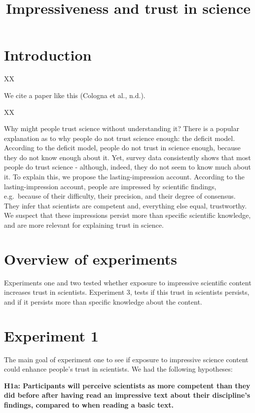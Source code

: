 \documentclass[
  doc,floatsintext]{apa6}
\title{Impressiveness and trust in science}
\author{\textsuperscript{}}
\date{}
\affiliation{\vspace{0.5cm}\textsuperscript{} }
\begin{document}
\maketitle

\section{Introduction}\label{introduction}

XX

We cite a paper like this (Cologna et al., n.d.).

XX

Why might people trust science without understanding it? There is a popular explanation as to why people do not trust science enough: the deficit model. According to the deficit model, people do not trust in science enough, because they do not know enough about it. Yet, survey data consistently shows that most people do trust science - although, indeed, they do not seem to know much about it. To explain this, we propose the lasting-impression account. According to the lasting-impression account, people are impressed by scientific findings, e.g.~because of their difficulty, their precision, and their degree of consensus. They infer that scientists are competent and, everything else equal, trustworthy. We suspect that these impressions persist more than specific scientific knowledge, and are more relevant for explaining trust in science.

\section{Overview of experiments}\label{overview-of-experiments}

Experiments one and two tested whether exposure to impressive scientific content increases trust in scientists. Experiment 3, tests if this trust in scientists persists, and if it persists more than specific knowledge about the content.

\section{Experiment 1}\label{experiment-1}

The main goal of experiment one to see if exposure to impressive science content could enhance people's trust in scientists. We had the following hypotheses:

\textbf{H1a: Participants will perceive scientists as more competent than they did before after having read an impressive text about their discipline's findings, compared to when reading a basic text.}
\end{document}
